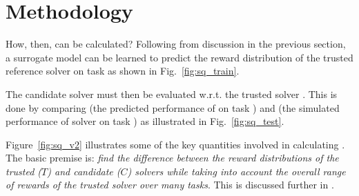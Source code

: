 \section{Methodology} \label{sec:methodology}
How, then, can \xQ{} be calculated? Following from discussion in the previous section, a surrogate model \surrogate{} can be learned to predict the reward distribution \rwdstarapprox{} of the trusted reference solver \solvestar{} on task \task{} as shown in Fig.~\ref{fig:sq_train}.

The candidate solver \solve{} must then be evaluated w.r.t. the trusted solver \solvestar{}. This is done by comparing \rwdstarapprox{} (the predicted performance of \solvestar{} on task \task) and \rwd{} (the simulated performance of solver \solve{} on task \task) as illustrated in Fig.~\ref{fig:sq_test}.

Figure~\ref{fig:sq_v2} illustrates some of the key quantities involved in calculating \xQ. The basic premise is: \emph{find the difference between the reward distributions of the trusted ($T$) and candidate ($C$) solvers while taking into account the overall range of rewards of the trusted solver over many tasks}. This is discussed further in \cite{Israelsen2018-qz}.

